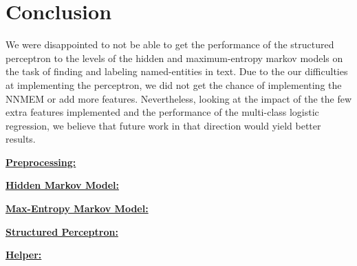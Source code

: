 \documentclass[11pt]{article}
\begin{document}
\section{Conclusion}
We were disappointed to not be able to get the performance of the structured perceptron to the levels of the hidden and maximum-entropy markov models on the task of finding and labeling named-entities in text. Due to the our difficulties at implementing the perceptron, we did not get the chance of implementing the NNMEM or add more features. Nevertheless, looking at the impact of the the few extra features implemented and the performance of the multi-class logistic regression, we believe that future work in that direction would yield better results.



\begin{appendices}
\textbf{\huge\underline{Preprocessing:}}


\textbf{\huge\underline{Hidden Markov Model:}}


\textbf{\huge\underline{Max-Entropy Markov Model:}}


\textbf{\huge\underline{Structured Perceptron:}}


\textbf{\huge\underline{Helper:}}

\end{appendices}
\end{document}
